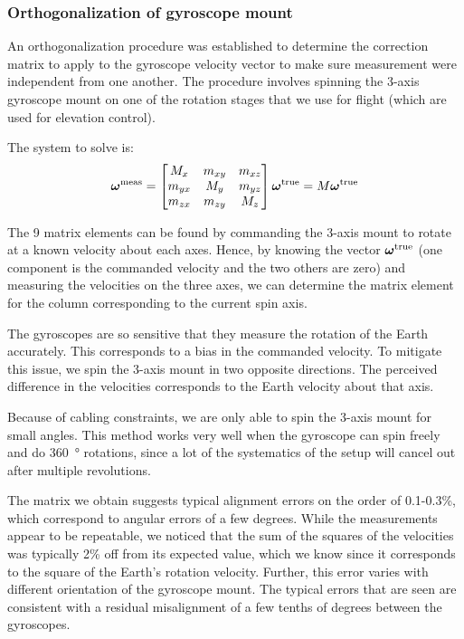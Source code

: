 \subsubsection{Orthogonalization of gyroscope mount}
\label{ap:gyroOrth}

An orthogonalization procedure was established to determine the correction matrix to apply to the gyroscope velocity vector to make sure measurement were independent from one another. The procedure involves spinning the 3-axis gyroscope mount on one of the rotation stages that we use for flight (which are used for elevation control). 

The system to solve is:
\begin{equation}
\boldsymbol\omega^\textrm{meas} = \begin{bmatrix} M_x & m_{xy} & m_{xz} \\   m_{yx} & M_y &m_{yz} \\  m_{zx} & m_{zy} & M_z \end{bmatrix} \boldsymbol\omega^\textrm{true} = M \boldsymbol\omega^\textrm{true} 
\end{equation}

The 9 matrix elements can be found by commanding the 3-axis mount to rotate at a known velocity about each axes. Hence, by knowing the vector $\boldsymbol\omega^\textrm{true}$ (one component is the commanded velocity and the two others are zero) and measuring the velocities on the three axes, we can determine the matrix element for the column corresponding to the current spin axis. 

The gyroscopes are so sensitive that they measure the rotation of the Earth accurately. This corresponds to a bias in the commanded velocity. To mitigate this issue, we spin the 3-axis mount in two opposite directions. The perceived difference in the velocities corresponds to the Earth velocity about that axis. 

Because of cabling constraints, we are only able to spin the 3-axis mount for small angles. This method works very well when the gyroscope can spin freely and do \SI{360}{\degree} rotations, since a lot of the systematics of the setup will cancel out after multiple revolutions. 

The matrix we obtain suggests typical alignment errors on the order of 0.1-0.3\%, which correspond to angular errors of a few degrees. While the measurements appear to be repeatable, we noticed that the sum of the squares of the velocities was typically 2\% off from its expected value, which we know since it corresponds to the square of the Earth's rotation velocity. Further, this error varies with different orientation of the gyroscope mount. The typical errors that are seen are consistent with a residual misalignment of a few tenths of degrees between the gyroscopes.

